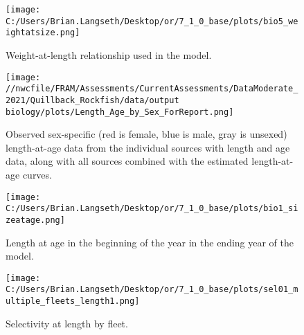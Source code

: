 \documentclass[11pt,
  english,
  a4paper,
]{article}
\begin{document}

\begin{figure}
\centering
\texttt{[image: C:/Users/Brian.Langseth/Desktop/or/7\_1\_0\_base/plots/bio5\_weightatsize.png]}
\caption{Weight-at-length relationship used in the model.\label{fig:len-weight}}
\end{figure}

\tagmcend\tagstructend


\begin{figure}
\centering
\texttt{[image: //nwcfile/FRAM/Assessments/CurrentAssessments/DataModerate\_2021/Quillback\_Rockfish/data/output biology/plots/Length\_Age\_by\_Sex\_ForReport.png]}
\caption{Observed sex-specific (red is female, blue is male, gray is unsexed) length-at-age data from the individual sources with length and age data, along with all sources combined with the estimated length-at-age curves.\label{fig:len-age-data}}
\end{figure}

\tagmcend\tagstructend


\begin{figure}
\centering
\texttt{[image: C:/Users/Brian.Langseth/Desktop/or/7\_1\_0\_base/plots/bio1\_sizeatage.png]}
\caption{Length at age in the beginning of the year in the ending year of the model.\label{fig:len-age-ss}}
\end{figure}

\tagmcend\tagstructend


\begin{figure}
\centering
\texttt{[image: C:/Users/Brian.Langseth/Desktop/or/7\_1\_0\_base/plots/sel01\_multiple\_fleets\_length1.png]}
\caption{Selectivity at length by fleet.\label{fig:selex}}
\end{figure}
\end{document}
